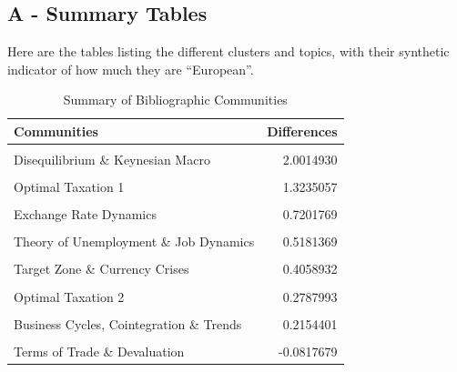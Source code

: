 \documentclass[]{elsarticle} %
\begin{document}
\hypertarget{a---summary-tables}{%
\subsection*{A - Summary Tables}\label{a---summary-tables}}

Here are the tables listing the different clusters and topics, with
their synthetic indicator of how much they are ``European''.

\begin{table}[!h]

\caption{\label{tab:summary-communities}Summary of Bibliographic Communities}
\centering
\fontsize{9}{11}\selectfont
\begin{tabular}[t]{lr}
\toprule
Communities & Differences\\
\midrule
\cellcolor{gray!6}{Modeling Consumption \& Production} & \cellcolor{gray!6}{2.0986873}\\
Disequilibrium \& Keynesian Macro & 2.0014930\\
\cellcolor{gray!6}{International Macroeconomics \& Target Zone} & \cellcolor{gray!6}{1.3359739}\\
Optimal Taxation 1 & 1.3235057\\
\cellcolor{gray!6}{Political Economics of Central Banks} & \cellcolor{gray!6}{1.0265264}\\
\addlinespace
Exchange Rate Dynamics & 0.7201769\\
\cellcolor{gray!6}{Taxation, Tobin's Q \& Monetarism} & \cellcolor{gray!6}{0.6388438}\\
Theory of Unemployment \& Job Dynamics & 0.5181369\\
\cellcolor{gray!6}{Capital \& Income Taxation} & \cellcolor{gray!6}{0.4078902}\\
Target Zone \& Currency Crises & 0.4058932\\
\addlinespace
\cellcolor{gray!6}{Coordination \& Sunspots 2} & \cellcolor{gray!6}{0.3465849}\\
Optimal Taxation 2 & 0.2787993\\
\cellcolor{gray!6}{Monetary Policy, Financial Transmission \& Cycles 2} & \cellcolor{gray!6}{0.2314883}\\
Business Cycles, Cointegration \& Trends & 0.2154401\\
\cellcolor{gray!6}{Taxation, Debt \& Growth} & \cellcolor{gray!6}{-0.0067936}\\
\addlinespace
Terms of Trade \& Devaluation & -0.0817679\\

\end{tabular}
\end{table}
\end{document}
